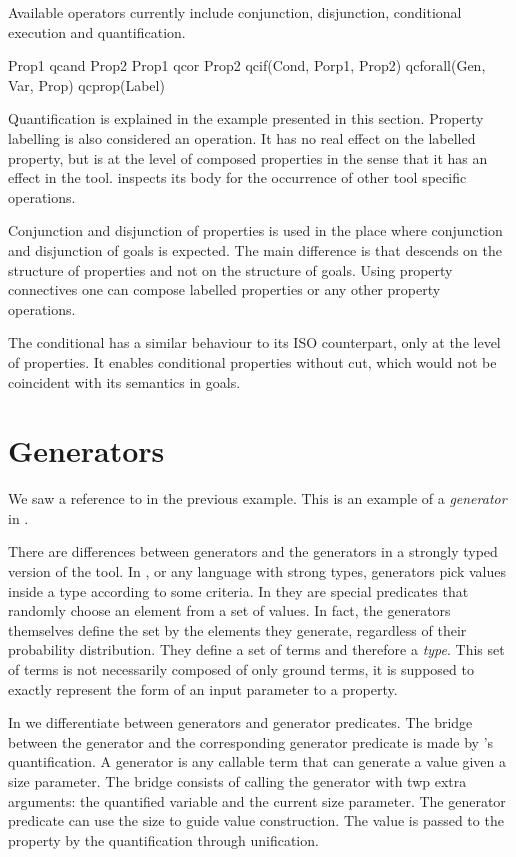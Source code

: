 Available operators currently include conjunction, disjunction,
conditional execution and quantification.
%
\begin{yapcode}
   Prop1 qcand Prop2
   Prop1 qcor Prop2
   qcif(Cond, Porp1, Prop2)
   qcforall(Gen, Var, Prop)
   qcprop(Label)
\end{yapcode}
%
Quantification is explained in the example presented in this section.
%
Property labelling is also considered an operation.
%
It has no real effect on the labelled property, but is at the level of
composed properties in the sense that it has an effect in the tool.
%
\plqc{} inspects its body for the occurrence of other tool specific
operations.


Conjunction and disjunction of properties is used in the place where
conjunction and disjunction of goals is expected.
%
The main difference is that \plqc{} descends on the structure of
properties and not on the structure of goals.
%
Using property connectives one can compose labelled properties or any
other \plqc{} property operations.


The conditional  has a similar behaviour to its ISO
\Prolog{} counterpart, only at the level of \plqc{} properties.
%
It enables conditional properties without cut, which would not be
coincident with its semantics in \Prolog{} goals.


\section{Generators}
\label{sec:generators}

We saw a reference to  in the previous example.
%
This is an example of a \emph{generator} in \plqc{}.



There are  differences between \plqc{} generators and the
generators in a strongly typed version of the tool.
%
In \Haskell{} \QuickCheck{}, or any language with strong types,
generators pick values inside a type according to some criteria.
%
In \plqc{} they are special predicates that randomly choose an element
from a set of values.
%
In fact, the generators themselves define the set by the elements
they generate, regardless of their probability distribution.
%
They define a set of terms and therefore a \emph{type}.
%
This set of terms is not necessarily composed of only ground terms, it
is supposed to exactly represent the form of an input parameter to a
property.


In \plqc{} we differentiate between generators and generator
predicates.
%
The bridge between the generator and the corresponding generator
predicate is made by \plqc{}'s quantification.
%
A generator is any callable term that can generate a value given a
size parameter.
%
The bridge consists of calling the generator with twp extra
arguments: the quantified variable and the current size parameter.
%
The generator predicate can use the size to guide value
construction.
%
The value is passed to the property by the \plqc{} quantification
through unification.


